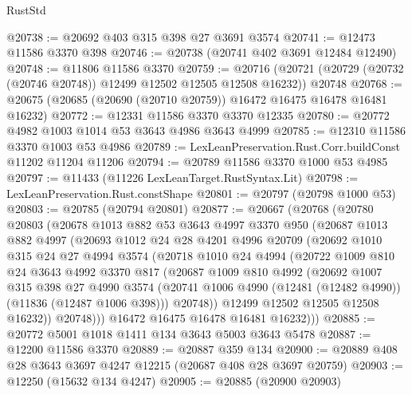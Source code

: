 \begin{lexlean}{RustStd}
\begin{coremodule}
@20738 := @20692 @403 @315 @398 @27 @3691 @3574
@20741 := @12473 @11586 @3370 @398
@20746 := @20738 (@20741 @402 @3691 @12484 @12490)
@20748 := @11806 @11586 @3370
@20759 := @20716
    (@20721 (@20729 (@20732 (@20746 @20748)) @12499 @12502 @12505 @12508 @16232))
    @20748
@20768 := @20675 (@20685 (@20690 (@20710 @20759)) @16472 @16475 @16478 @16481 @16232)
@20772 := @12331 @11586 @3370 @3370 @12335
@20780 := @20772 @4982 @1003 @1014 @53 @3643 @4986 @3643 @4999
@20785 := @12310 @11586 @3370 @1003 @53 @4986
@20789 := LexLeanPreservation.Rust.Corr.buildConst @11202 @11204 @11206
@20794 := @20789 @11586 @3370 @1000 @53 @4985
@20797 := @11433 (@11226 LexLeanTarget.RustSyntax.Lit)
@20798 := LexLeanPreservation.Rust.constShape
@20801 := @20797 (@20798 @1000 @53)
@20803 := @20785 (@20794 @20801)
@20877 := @20667
    (@20768
      (@20780
        @20803
        (@20678
          @1013
          @882
          @53
          @3643
          @4997
          @3370
          @950
          (@20687
            @1013
            @882
            @4997
            (@20693
              @1012
              @24
              @28
              @4201
              @4996
              @20709
              (@20692
                @1010
                @315
                @24
                @27
                @4994
                @3574
                (@20718
                  @1010
                  @24
                  @4994
                  (@20722
                    @1009
                    @810
                    @24
                    @3643
                    @4992
                    @3370
                    @817
                    (@20687
                      @1009
                      @810
                      @4992
                      (@20692
                        @1007
                        @315
                        @398
                        @27
                        @4990
                        @3574
                        (@20741 @1006 @4990 (@12481 (@12482 @4990)) (@11836 (@12487 @1006 @398)))
                        @20748))
                    @12499
                    @12502
                    @12505
                    @12508
                    @16232))
                @20748)))
          @16472
          @16475
          @16478
          @16481
          @16232)))
@20885 := @20772 @5001 @1018 @1411 @134 @3643 @5003 @3643 @5478
@20887 := @12200 @11586 @3370
@20889 := @20887 @359 @134
@20900 := @20889 @408 @28 @3643 @3697 @4247 @12215 (@20687 @408 @28 @3697 @20759)
@20903 := @12250 (@15632 @134 @4247)
@20905 := @20885 (@20900 @20903)

\end{coremodule}
\end{lexlean}
